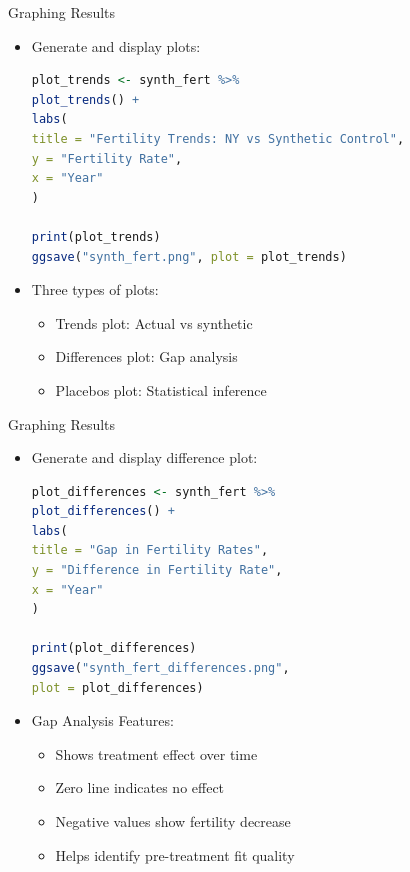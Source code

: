 \documentclass[hyperref={pdfpagelabels=false}]{beamer}
\begin{document}
\begin{frame}[fragile]{Graphing Results}
\begin{itemize}
\item Generate and display plots:
\vspace{0.2cm}
\begin{lstlisting}[language=R, style=r-style]
plot_trends <- synth_fert %>%
plot_trends() +
labs(
title = "Fertility Trends: NY vs Synthetic Control",
y = "Fertility Rate",
x = "Year"
)

print(plot_trends)  
ggsave("synth_fert.png", plot = plot_trends)
\end{lstlisting}
\item Three types of plots:
\begin{itemize}
\item Trends plot: Actual vs synthetic
\item Differences plot: Gap analysis
\item Placebos plot: Statistical inference
\end{itemize}
\end{itemize}
\end{frame}


\begin{frame}[fragile]{Graphing Results}
\begin{itemize}
	\item Generate and display difference plot:
	\vspace{0.2cm}
\begin{lstlisting}[language=R, style=r-style]
plot_differences <- synth_fert %>%
plot_differences() +
labs(
title = "Gap in Fertility Rates",
y = "Difference in Fertility Rate",
x = "Year"
)

print(plot_differences)
ggsave("synth_fert_differences.png", 
plot = plot_differences)
\end{lstlisting}
	\item Gap Analysis Features:
	\begin{itemize}
		\item Shows treatment effect over time
		\item Zero line indicates no effect
		\item Negative values show fertility decrease
		\item Helps identify pre-treatment fit quality
	\end{itemize}
\end{itemize}
\end{frame}
\end{document}
